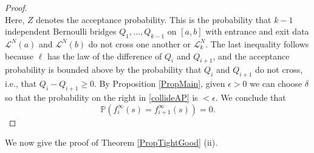 \begin{proof}
\begin{equation}
	\end{equation}
	Here, $Z$ denotes the acceptance probability. This is the probability that $k-1$ independent Bernoulli bridges $Q_1,\dots,Q_{k-1}$ on $[a,b]$ with entrance and exit data $\mathcal{L}^N(a)$ and $\mathcal{L}^N(b)$ do not cross one another or $\mathcal{L}_k^N$. The last inequality follows because $\ell$ has the law of the difference of $Q_i$ and $Q_{i+1}$, and the acceptance probability is bounded above by the probability that $Q_i$ and $Q_{i+1}$ do not cross, i.e., that $Q_i - Q_{i+1} \geq 0$. By Proposition \ref{PropMain}, given $\epsilon > 0$ we can choose $\delta$ so that the probability on the right in \eqref{collideAP} is $<\epsilon$. We conclude that
	\[
	\mathbb{P}\left(f_i^\infty(s) = f_{i+1}^\infty(s)\right) = 0.
	\]
\end{proof}

We now give the proof of Theorem \ref{PropTightGood} (ii).

